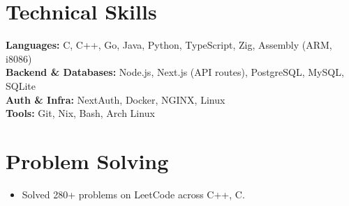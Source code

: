 \documentclass[a4paper,10pt]{article}
\begin{document}
\section*{Technical Skills}

\textbf{Languages:} C, C++, Go, Java, Python, TypeScript, Zig, Assembly (ARM, i8086) \\
\textbf{Backend \& Databases:} Node.js, Next.js (API routes), PostgreSQL, MySQL, SQLite \\
\textbf{Auth \& Infra:} NextAuth, Docker, NGINX, Linux \\
\textbf{Tools:} Git, Nix, Bash, Arch Linux \\

\section*{Problem Solving}

\begin{itemize}[noitemsep, topsep=2pt]
    \item Solved 280+ problems on LeetCode across C++, C.
\end{itemize}
\end{document}
